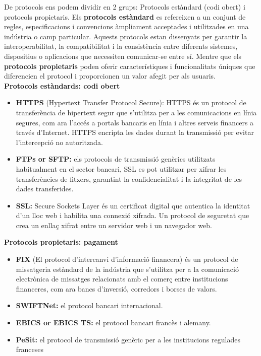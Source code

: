\documentclass[a4paper,12pt,twoside]{ThesisStyle}
\begin{document}
De protocols ens podem dividir en 2 grups: Protocols estàndard (codi obert) i protocols propietaris. Els \textbf{protocols estàndard} es refereixen a un conjunt de regles, especificacions i convencions àmpliament acceptades i utilitzades en una indústria o camp particular. Aquests protocols estan dissenyats per garantir la interoperabilitat, la compatibilitat i la consistència entre diferents sistemes, dispositius o aplicacions que necessiten comunicar-se entre sí. Mentre que els \textbf{protocols propietaris} poden oferir característiques i funcionalitats úniques que diferencien el protocol i proporcionen un valor afegit per als usuaris. \\

\textbf{Protocols estàndards: codi obert}
\begin{itemize}
    \item \textbf{HTTPS} (Hypertext Transfer Protocol Secure): HTTPS és un protocol de transferència de hipertext segur que s'utilitza per a les comunicacions en línia segures, com ara l'accés a portals bancaris en línia i altres serveis financers a través d'Internet. HTTPS encripta les dades durant la transmissió per evitar l'intercepció no autoritzada.
    \item \textbf{FTPs or SFTP:} els protocols de transmissió genèrics utilitzats habitualment en el sector bancari, SSL es pot utilitzar per xifrar les transferències de fitxers, garantint la confidencialitat i la integritat de les dades transferides.
    \item \textbf{SSL: } Secure Sockets Layer és un certificat digital que autentica la identitat d'un lloc web i habilita una connexió xifrada. Un protocol de seguretat que crea un enllaç xifrat entre un servidor web i un navegador web.
\end{itemize}

\vspace{3mm}

\textbf{Protocols propietaris: pagament}
\begin{itemize}
    \item \textbf{FIX} (El protocol d'intercanvi d'informació financera) és un protocol de missatgeria estàndard de la indústria que s'utilitza per a la comunicació electrònica de missatges relacionats amb el comerç entre institucions financeres, com ara bancs d'inversió, corredors i borses de valors.
    \item \textbf{SWIFTNet:} el protocol bancari internacional.
    \item \textbf{EBICS or EBICS TS:} el protocol bancari francès i alemany.
    \item \textbf{PeSit:} el protocol de transmissió genèric per a les institucions regulades franceses
\end{itemize}
\end{document}
